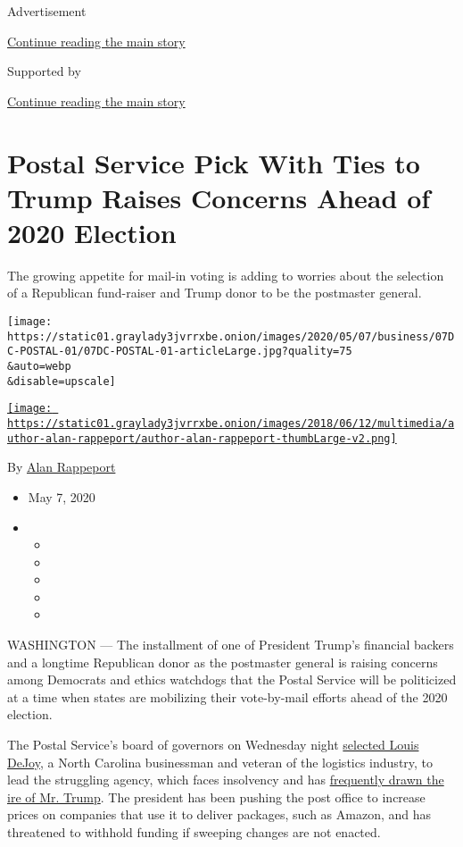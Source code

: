 Advertisement

\protect\hyperlink{after-top}{Continue reading the main story}

Supported by

\protect\hyperlink{after-sponsor}{Continue reading the main story}

\hypertarget{postal-service-pick-with-ties-to-trump-raises-concerns-ahead-of-2020-election}{%
\section{Postal Service Pick With Ties to Trump Raises Concerns Ahead of
2020
Election}\label{postal-service-pick-with-ties-to-trump-raises-concerns-ahead-of-2020-election}}

The growing appetite for mail-in voting is adding to worries about the
selection of a Republican fund-raiser and Trump donor to be the
postmaster general.

\texttt{[image: https://static01.graylady3jvrrxbe.onion/images/2020/05/07/business/07DC-POSTAL-01/07DC-POSTAL-01-articleLarge.jpg?quality=75\\\&auto=webp\\\&disable=upscale]}

\href{https://www.nytimes3xbfgragh.onion/by/alan-rappeport}{\texttt{[image: https://static01.graylady3jvrrxbe.onion/images/2018/06/12/multimedia/author-alan-rappeport/author-alan-rappeport-thumbLarge-v2.png]}}

By \href{https://www.nytimes3xbfgragh.onion/by/alan-rappeport}{Alan
Rappeport}

\begin{itemize}
\item
  May 7, 2020
\item
  \begin{itemize}
  \item
  \item
  \item
  \item
  \item
  \end{itemize}
\end{itemize}

WASHINGTON --- The installment of one of President Trump's financial
backers and a longtime Republican donor as the postmaster general is
raising concerns among Democrats and ethics watchdogs that the Postal
Service will be politicized at a time when states are mobilizing their
vote-by-mail efforts ahead of the 2020 election.

The Postal Service's board of governors on Wednesday night
\href{https://about.usps.com/newsroom/national-releases/2020/0506-bog-announces-selection-of-louis-dejoy-to-serve-as-nations-75th-postmaster-general.htm?mod=article_inline}{selected
Louis DeJoy}, a North Carolina businessman and veteran of the logistics
industry, to lead the struggling agency, which faces insolvency and has
\href{https://www.nytimes3xbfgragh.onion/2018/04/12/us/politics/trump-postal-service-amazon.html}{frequently
drawn the ire of Mr. Trump}. The president has been pushing the post
office to increase prices on companies that use it to deliver packages,
such as Amazon, and has threatened to withhold funding if sweeping
changes are not enacted.

